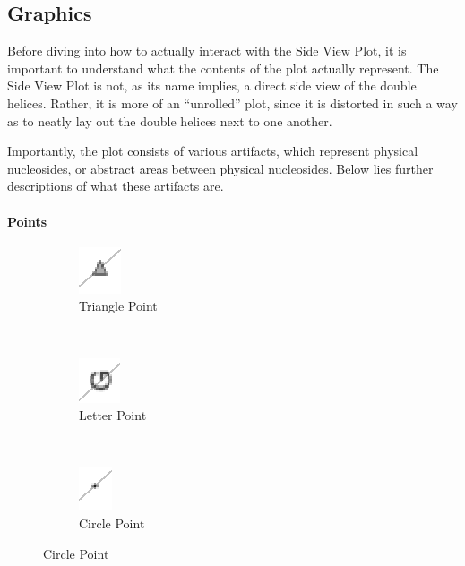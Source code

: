 \documentclass[titlepage]{article}
\begin{document}
	\subsection{Graphics}
	Before diving into how to actually interact with the Side View Plot, it is important to understand what the contents of the plot actually represent. The Side View Plot is not, as its name implies, a direct side view of the double helices. Rather, it is more of an “unrolled” plot, since it is distorted in such a way as to neatly lay out the double helices next to one another.
	
	Importantly, the plot consists of various artifacts, which represent physical nucleosides, or abstract areas between physical nucleosides. Below lies further descriptions of what these artifacts are.
	
	\paragraph{Points}
	
	\begin{figure}[h]
		\centering
		\caption{Side View Plot Point Graphics}
		\label{fig:side-view-plot-point-graphics}
		
		\begin{subfigure}{.3\linewidth}
			\centering
			\includegraphics[width=.3in]{up-triangle.png}
			\caption{Triangle Point}
			\label{fig:up-triangle}
		\end{subfigure}%
 		~
		\begin{subfigure}{.3\linewidth}
			\centering
			\includegraphics[width=.3in]{base-symbol.png}
			\caption{Letter Point}
			\label{fig:base-symbol}
		\end{subfigure}%
		~
		\begin{subfigure}{.3\linewidth}
			\centering
			\includegraphics[width=.3in]{nondominant-point.png}
			\caption{Circle Point}
			\label{fig:nondominant-point}
		\end{subfigure}
	\end{figure}
\end{document}
